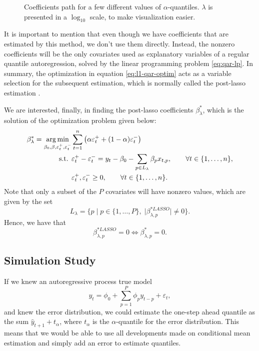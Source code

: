 \begin{figure}
\begin{minipage}[t]{0.4\linewidth}
\begin{minipage}[b]{\linewidth}
      \label{fig:npqar-cross}
     \end{minipage}
  \end{minipage}
  \caption{Coefficients path for a few different values of $\alpha$-quantiles. $\lambda$ is presented in a $\log_{10}$ scale, to make visualization easier.}
  \label{fig:npqar-results}
\end{figure}

It is important to mention that even though we have coefficients that are estimated by this method, we don't use them directly. Instead, the nonzero coefficients will be the only covariates used as explanatory variables of a regular quantile autoregression, solved by the linear programming problem \ref{eq:qar-lp}. In summary, the optimization in equation \ref{eq:l1-qar-optim} acts as a variable selection for the subsequent estimation, which is normally called the post-lasso estimation \cite{belloni2009least}.

We are interested, finally, in finding the post-lasso coefficients $\beta_\lambda^*$, which is the solution of the optimization problem given below:
\begin{equation}
\begin{aligned} \beta_\lambda^{*} = \operatorname*{arg\,min}_{\beta_0,\beta,\varepsilon_{t}^{+},\varepsilon_{t}^{-}} & \sum_{t=1}^{n}\left(\alpha\varepsilon_{t}^{+}+(1-\alpha)\varepsilon_{t}^{-}\right)\\
\mbox{s.t. } & \varepsilon_{t}^{+}-\varepsilon_{t}^{-}=y_{t} - \beta_0 - \sum_{p\in L_\lambda} \beta_p x_{t,p},\qquad\forall t\in\{1,\dots,n\},\\
& \varepsilon_t^+,\varepsilon_t^- \geq 0, \qquad \forall t \in \{1,\dots,n\}.
\end{aligned}
\label{eq:post-lasso}
\end{equation}
Note that only a subset of the $P$ covariates will have nonzero values, which are given by the set 
\begin{equation*}
L_\lambda = \{ p \; | \; p \in \{ 1,\dots,P \}, \; |\beta^{*LASSO}_{\lambda,p}| \neq 0  \}.
\end{equation*}
Hence, we have that
$$\beta^{*LASSO}_{\lambda,p} = 0 \iff \beta^{*}_{\lambda,p} = 0.$$


\subsection{Simulation Study}
\label{sec:simulation-ar1}
If we knew an autoregressive process true model
\[
	y_t = \phi_0 + \sum_{p=1}^{P} \phi_p y_{t-p} + \varepsilon_t,
\]
and knew the error distribution, we could estimate the one-step ahead quantile as the sum $\hat{y}_{t+1} + t_{\alpha}$, where $t_\alpha$ is the $\alpha$-quantile for the error distribution. This means that we would be able to use all developments made on conditional mean estimation and simply add an error to estimate quantiles. 

